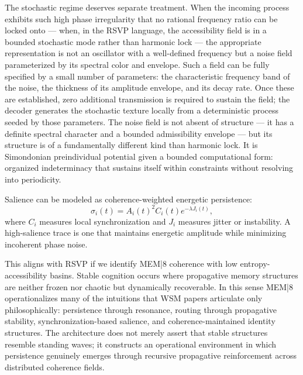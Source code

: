 \documentclass[12pt,a4paper]{article}
\begin{document}
The stochastic regime deserves separate treatment. When the incoming process exhibits such high phase irregularity that no rational frequency ratio can be locked onto — when, in the RSVP language, the accessibility field is in a bounded stochastic mode rather than harmonic lock — the appropriate representation is not an oscillator with a well-defined frequency but a noise field parameterized by its spectral color and envelope. Such a field can be fully specified by a small number of parameters: the characteristic frequency band of the noise, the thickness of its amplitude envelope, and its decay rate. Once these are established, zero additional transmission is required to sustain the field; the decoder generates the stochastic texture locally from a deterministic process seeded by those parameters. The noise field is not absent of structure — it has a definite spectral character and a bounded admissibility envelope — but its structure is of a fundamentally different kind than harmonic lock. It is Simondonian preindividual potential given a bounded computational form: organized indeterminacy that sustains itself within constraints without resolving into periodicity.

Salience can be modeled as coherence-weighted energetic persistence:
\[
\sigma_i(t)=A_i(t)^2 C_i(t) e^{-\lambda J_i(t)},
\]
where \(C_i\) measures local synchronization and \(J_i\) measures jitter or instability. A high-salience trace is one that maintains energetic amplitude while minimizing incoherent phase noise.

This aligns with RSVP if we identify MEM|8 coherence with low entropy-accessibility basins. Stable cognition occurs where propagative memory structures are neither frozen nor chaotic but dynamically recoverable. In this sense MEM|8 operationalizes many of the intuitions that WSM papers articulate only philosophically: persistence through resonance, routing through propagative stability, synchronization-based salience, and coherence-maintained identity structures. The architecture does not merely assert that stable structures resemble standing waves; it constructs an operational environment in which persistence genuinely emerges through recursive propagative reinforcement across distributed coherence fields.
\end{document}
